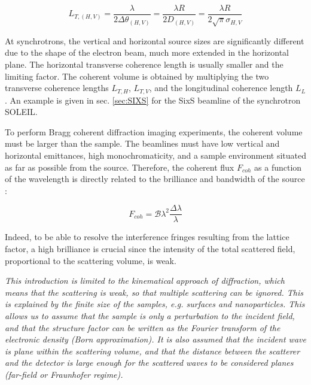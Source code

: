 \begin{equation}
    \label{eq:TransverseCoL}
    L_{T,(H, V)} = \frac{\lambda}{2\Delta\theta_{(H, V)}} = \frac{\lambda R}{2 D_{(H, V)}} = \frac{\lambda R}{2\sqrt{\pi}\sigma_{H, V}}
\end{equation}

At synchrotrons, the vertical and horizontal source sizes are significantly different due to the shape of the electron beam, much more extended in the horizontal plane.
The horizontal transverse coherence length is usually smaller and the limiting factor.
The coherent volume is obtained by multiplying the two transverse coherence lengths $L_{T,H}$, $L_{T,V}$, and the longitudinal coherence length $L_L$.
An example is given in sec. \ref{sec:SIXS} for the SixS beamline of the synchrotron SOLEIL.

To perform Bragg coherent diffraction imaging experiments, the coherent volume must be larger than the sample.
The beamlines must have low vertical and horizontal emittances, high monochromaticity, and a sample environment situated as far as possible from the source.
Therefore, the coherent flux $F_{coh}$ as a function of the wavelength is directly related to the brilliance and bandwidth of the source \parencite{Willmott}:

\begin{equation}
    \label{eq:CoherentFlux}
    F_{coh} = \mathcal{B} \lambda^2 \frac{\Delta \lambda}{\lambda}
\end{equation}

Indeed, to be able to resolve the interference fringes resulting from the lattice factor, a high brilliance is crucial since the intensity of the total scattered field, proportional to the scattering volume, is weak.

\textit{
This introduction is limited to the kinematical approach of diffraction, which means that the scattering is weak, so that multiple scattering can be ignored.
This is explained by the finite size of the samples, e.g. surfaces and nanoparticles.
This allows us to assume that the sample is only a perturbation to the incident field, and that the structure factor can be written as the Fourier transform of the electronic density (Born approximation).
It is also assumed that the incident wave is plane within the scattering volume, and that the distance between the scatterer and the detector is large enough for the scattered waves to be considered planes (far-field or Fraunhofer regime).
}
